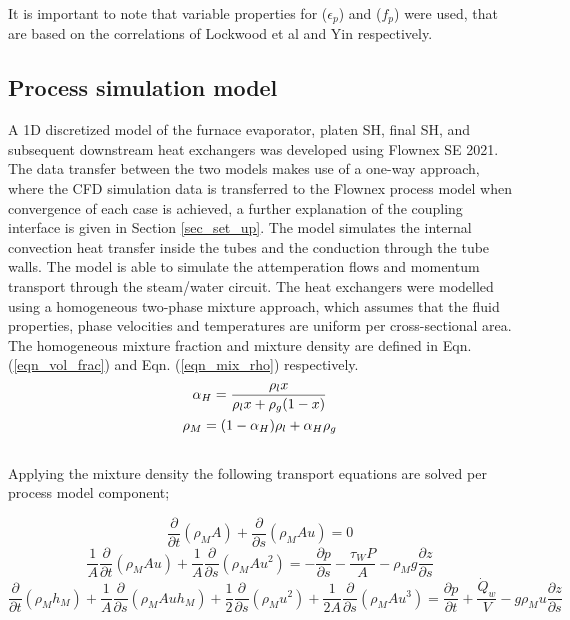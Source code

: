 \documentclass[11pt,cleanfoot]{asme2ej}
\begin{document}
It is important to note that variable properties for ($\epsilon_p$) and ($f_p$) were used, that are based on the correlations of Lockwood et al \cite{Lockwood1986} and Yin \cite{Yin2015} respectively.

\subsection{Process simulation model}
A 1D discretized model of the furnace evaporator, platen SH, final SH, and subsequent downstream heat exchangers was developed using Flownex SE\textsuperscript{\textregistered} 2021. The data transfer between the two models makes use of a one-way approach, where the CFD simulation data is transferred to the Flownex process model when convergence of each case is achieved, a further explanation of the coupling interface is given in Section  \ref{sec_set_up}. The model simulates the internal convection heat transfer inside the tubes and the conduction through the tube walls. The model is able to simulate the attemperation flows and momentum transport through the steam/water circuit. The heat exchangers were modelled using a homogeneous two-phase mixture approach, which assumes that the fluid properties, phase velocities and temperatures are uniform per cross-sectional area. The homogeneous mixture fraction and mixture density are defined in Eqn. (\ref{eqn_vol_frac}) and Eqn. (\ref{eqn_mix_rho}) respectively.
\begin{gather}
\alpha_H = \frac{\rho_l x}{\rho_lx + \rho_g(1-x)} \label{eqn_vol_frac}\\ 
\vspace{5mm}
\rho_M = (1-\alpha_H)\rho_l + \alpha_H\rho_g \label{eqn_mix_rho}
\end{gather}
Applying the mixture density the following transport equations are solved per process model component;

\begin{equation}\label{eqn_mix_conti}
\frac{\partial}{\partial t}(\rho_M A)+\frac{\partial}{\partial s}(\rho_MAu) = 0
\end{equation}
\begin{equation}\label{eqn_mix_mom}
\frac{1}{A} \frac{\partial}{\partial t}(\rho_M A u)+\frac{1}{A} \frac{\partial}{\partial s}(\rho_M A u^2) = -\frac{\partial p}{\partial s}-\frac{\tau_W P}{A}- \rho_M g \frac{\partial z}{\partial s}
\end{equation}
\begin{equation}\label{eqn_mix_energy}
\frac{\partial}{\partial t}(\rho_Mh_M)+\frac{1}{A}\frac{\partial}{\partial s}(\rho_MAuh_M)+\frac{1}{2}\frac{\partial}{\partial s}(\rho_Mu^2)+\frac{1}{2A}\frac{\partial}{\partial s}(\rho_MAu^3)=\frac{\partial p}{\partial t} + \frac{\dot{Q}_w}{V}-g\rho_Mu\frac{\partial z}{\partial s}
\end{equation}
\end{document}
